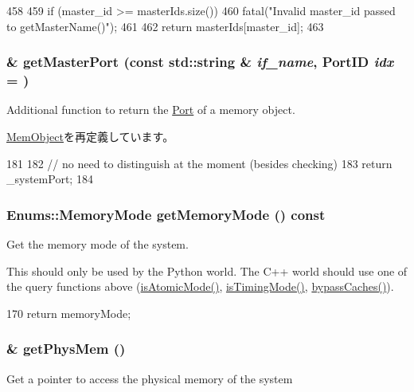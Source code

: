 \begin{DoxyCode}
458 {
459     if (master_id >= masterIds.size())
460         fatal("Invalid master_id passed to getMasterName()\n");
461 
462     return masterIds[master_id];
463 }
\end{DoxyCode}
\hypertarget{classSystem_adc4e675e51defbdd1e354dac729d0703}{
\subsubsection[{getMasterPort}]{ \& getMasterPort (const std::string \& {\em if\_\-name}, \/  {\bf PortID} {\em idx} = {})}}
\label{classSystem_adc4e675e51defbdd1e354dac729d0703}
Additional function to return the \hyperlink{classPort}{Port} of a memory object. 

\hyperlink{classMemObject_adc4e675e51defbdd1e354dac729d0703}{MemObject}を再定義しています。


\begin{DoxyCode}
181 {
182     // no need to distinguish at the moment (besides checking)
183     return _systemPort;
184 }
\end{DoxyCode}
\hypertarget{classSystem_a1a43e0888d498acd3b15fcbd678998d6}{
\subsubsection[{getMemoryMode}]{\setlength{\rightskip}{0pt plus 5cm}Enums::MemoryMode getMemoryMode () const}}
\label{classSystem_a1a43e0888d498acd3b15fcbd678998d6}
Get the memory mode of the system.

This should only be used by the Python world. The C++ world should use one of the query functions above (\hyperlink{classSystem_a6685592df58820e9bb30d94908c9881a}{isAtomicMode()}, \hyperlink{classSystem_ae04bdd25f4dde1cc1b58b22505aa869c}{isTimingMode()}, \hyperlink{classSystem_a613d9d917b0e950cd322026de403d702}{bypassCaches()}). 


\begin{DoxyCode}
170 { return memoryMode; }
\end{DoxyCode}
\hypertarget{classSystem_af828d179222e0a3764213c270bfa4097}{
\subsubsection[{getPhysMem}]{\& getPhysMem ()}}
\label{classSystem_af828d179222e0a3764213c270bfa4097}
Get a pointer to access the physical memory of the system 



